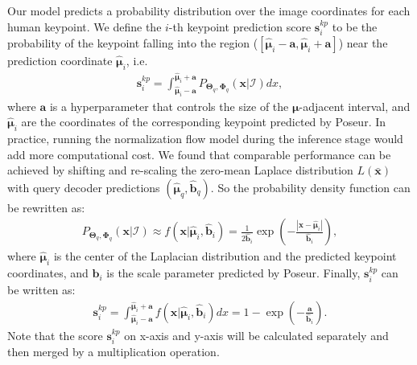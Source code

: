 \documentclass[runningheads]{llncs}
\def\ie{{i.e.\xspace}}
\def\handle{{Poseur}\xspace}
\def\loc{{\boldsymbol{\mu}}}
\def\a{\mathbf{a}}
\def\x{{\mathbf{x}}}
\def\BTheta{{\boldsymbol{\Theta}}}
\def\BPhi{{\boldsymbol{\Phi}}}
\begin{document}
Our model predicts a probability distribution over the image coordinates for each human keypoint. 
We define the $i$-th keypoint prediction score $\boldsymbol{s}^{kp}_{i}$ to be the probability of the keypoint falling into the region ($[\hat{\loc}_{i}-\a,\hat{\loc}_{i}+\a]$) near the prediction coordinate $\hat{\loc}_{i}$, \ie
\begin{equation}
\begin{aligned}
    \boldsymbol{s}_{i}^{kp} = \int_{\hat{\loc}_{i}-\a}^{\hat{\loc}_{i}+\a} P_{{\BTheta}_{q},{\BPhi}_{q}}(\x | \mathcal{I}) dx,
\end{aligned}
\end{equation}
where $\a$ is a hyperparameter that controls the size of the $\loc$-adjacent interval, and $\hat{\loc}_{i}$ are the coordinates of the corresponding keypoint predicted by \handle.
In practice, running the normalization flow model during the inference stage would add more computational cost. We found that comparable performance can be achieved by shifting and re-scaling the zero-mean Laplace distribution $L(\bar{\x})$ with query decoder predictions $(\hat{\loc}_{q}, \hat{\boldsymbol{b}}_{q})$. So the probability density function can be rewritten as:
\begin{equation}\label{equation:score}
\begin{aligned}
    P_{{\BTheta}_{q},{\BPhi}_{q}}(\x | \mathcal{I}) \approx f(\x|\hat{\loc}_{i}, \hat{\boldsymbol{b}}_{i}) = \frac{1}{2\hat{\boldsymbol{b}}_{i}}\exp{(-\frac{|\x-\hat{\loc}_{i}|}{\hat{\boldsymbol{b}}_{i}})},
\end{aligned}
\end{equation}
where $\hat{\loc}_{i}$ is the center of the Laplacian distribution and the predicted keypoint coordinates, and $\hat{\boldsymbol{b}}_{i}$ is the scale parameter predicted by \handle. Finally, $\boldsymbol{s}_{i}^{kp}$ can be written as:
\begin{equation}
\begin{aligned}
    \boldsymbol{s}_{i}^{kp} = \int_{\hat{\loc}_{i}-\a}^{\hat{\loc}_{i}+\a} f(\x|\hat{\loc}_{i}, \hat{\boldsymbol{b}}_{i}) dx = 1 - \exp{(-\frac{\a}{\hat{\boldsymbol{b}}_{i}})}. \label{eq8}
\end{aligned}
\end{equation}
Note that the score $\boldsymbol{s}_{i}^{kp}$ on x-axis and y-axis will be calculated separately and then merged by a multiplication operation.
\end{document}
